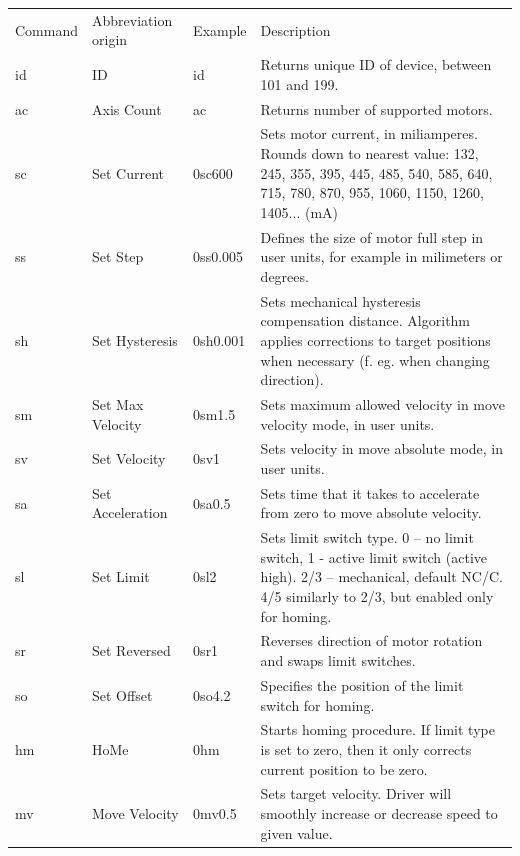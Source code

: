 \documentclass[10pt,article]{article}
\begin{document}
\begin{table}[ht] \centering
\begin{tabularx}{\textwidth}{lllX}
\rowcolor[gray]{0.80} Command & Abbreviation origin & Example & Description\\
\rowcolor[gray]{0.90} id & ID & id & Returns unique ID of device, between 101 and 199.\\
\rowcolor[gray]{0.95} ac & Axis Count & ac & Returns number of supported motors.\\
\rowcolor[gray]{0.90} sc & Set Current & 0sc600 &Sets motor current, in miliamperes. Rounds down to nearest value: 132, 245, 355, 395, 445, 485, 540, 585, 640, 715, 780, 870, 955, 1060, 1150, 1260, 1405... (mA) \\
\rowcolor[gray]{0.95} ss & Set Step & 0ss0.005 & Defines the size of motor full step in user units, for example in milimeters or degrees. \\
\rowcolor[gray]{0.90} sh & Set Hysteresis & 0sh0.001 & Sets mechanical hysteresis compensation distance. Algorithm applies corrections to target positions when necessary (f. eg. when changing direction). \\
\rowcolor[gray]{0.95} sm & Set Max Velocity & 0sm1.5 & Sets maximum allowed velocity in move velocity mode, in user units. \\
\rowcolor[gray]{0.90} sv & Set Velocity & 0sv1 & Sets velocity in move absolute mode, in user units. \\
\rowcolor[gray]{0.95} sa & Set Acceleration & 0sa0.5 & Sets time that it takes to accelerate from zero to move absolute velocity. \\
\rowcolor[gray]{0.90} sl & Set Limit & 0sl2 & Sets limit switch type. 0 – no limit switch, 1 - active limit switch (active high). 2/3 – mechanical, default NC/C. 4/5 similarly to 2/3, but enabled only for homing. \\
\rowcolor[gray]{0.95} sr & Set Reversed & 0sr1 & Reverses direction of motor rotation and swaps limit switches. \\
\rowcolor[gray]{0.90} so & Set Offset & 0so4.2 & Specifies the position of the limit switch for homing. \\
\rowcolor[gray]{0.95} hm & HoMe & 0hm & Starts homing procedure. If limit type is set to zero, then it only corrects current position to be zero. \\
\rowcolor[gray]{0.90} mv & Move Velocity & 0mv0.5 & Sets target velocity. Driver will smoothly increase or decrease speed to given value. \\

\end{tabularx}
\end{table}
\end{document}
